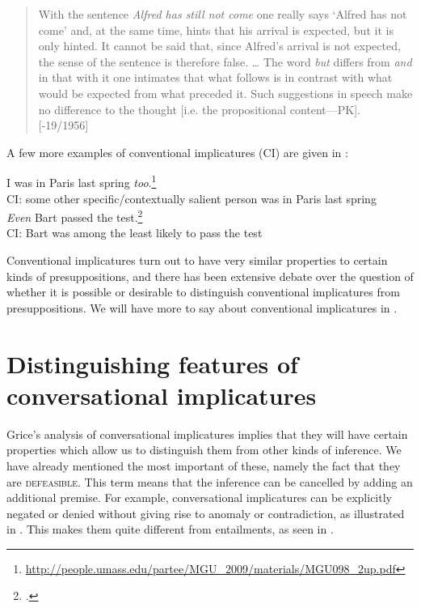 \begin{quote}
With the sentence \textit{Alfred has still not come} one really says ‘Alfred has not come’ and, at the same time, hints that his arrival is expected, but it is only hinted. It cannot be said that, since Alfred’s arrival is not expected, the sense of the sentence is therefore false. … The word \textit{but} differs from \textit{and} in that with it one intimates that what follows is in contrast with what would be expected from what preceded it. Such suggestions in speech make no difference to the thought [i.e. the propositional content—PK]. [\citealt{Frege1918}-19/1956]
\end{quote}


A few more examples of conventional implicatures (CI) are given in :


\ea \label{ex:8.16}
\ea  I was in Paris last spring \textit{too}.\footnote{\url{http://people.umass.edu/partee/MGU_2009/materials/MGU098_2up.pdf}} \\
CI: some other specific/contextually salient person was in Paris last spring\\
\ex   \textit{Even} Bart passed the test.\footnote{\citet{Potts2007a}.}\\
CI: Bart was among the least likely to pass the test
\z
\z


Conventional implicatures turn out to have very similar properties to certain kinds of presuppositions, and there has been extensive debate over the question of whether it is possible or desirable to distinguish conventional implicatures from presuppositions. We will have more to say about conventional implicatures in .


\section{Distinguishing features of conversational implicatures}\label{sec:} %

Grice’s analysis of conversational implicatures implies that they will have certain properties which allow us to distinguish them from other kinds of inference. We have already mentioned the most important of these, namely the fact that they are \textsc{defeasible}. This term means that the inference can be cancelled by adding an additional premise. For example, conversational implicatures can be explicitly negated or denied without giving rise to anomaly or contradiction, as illustrated in . This makes them quite different from entailments, as seen in .


